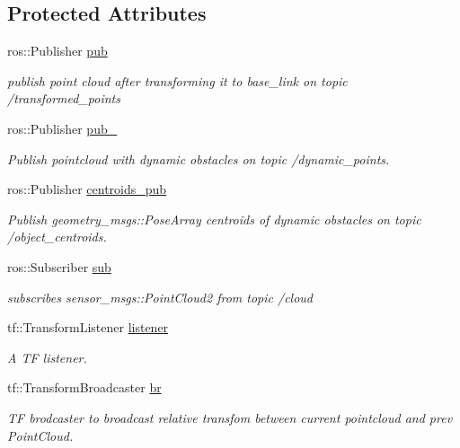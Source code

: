 \subsection*{Protected Attributes}
\begin{DoxyCompactItemize}
\item 
ros\+::\+Publisher \hyperlink{classdatmo_1_1cloud__segmentation_a01955e35ed0d12b9da4d4d9afb1007e3}{pub}
\begin{DoxyCompactList}\small\item\em publish point cloud after transforming it to base\+\_\+link on topic /transformed\+\_\+points \end{DoxyCompactList}\item 
ros\+::\+Publisher \hyperlink{classdatmo_1_1cloud__segmentation_a0e1bf18752add68fc2df89e212750d91}{pub\+\_}
\begin{DoxyCompactList}\small\item\em Publish pointcloud with dynamic obstacles on topic /dynamic\+\_\+points. \end{DoxyCompactList}\item 
ros\+::\+Publisher \hyperlink{classdatmo_1_1cloud__segmentation_a287579b3989262f060341ebca1ed53b2}{centroids\+\_\+pub}
\begin{DoxyCompactList}\small\item\em Publish geometry\+\_\+msgs\+::\+Pose\+Array centroids of dynamic obstacles on topic /object\+\_\+centroids. \end{DoxyCompactList}\item 
ros\+::\+Subscriber \hyperlink{classdatmo_1_1cloud__segmentation_a72e340852b66e150cb7f0e25214b7439}{sub}
\begin{DoxyCompactList}\small\item\em subscribes sensor\+\_\+msgs\+::\+Point\+Cloud2 from topic /cloud \end{DoxyCompactList}\item 
tf\+::\+Transform\+Listener \hyperlink{classdatmo_1_1cloud__segmentation_abf9b807df25f63ea330b165a9f2e4be1}{listener}
\begin{DoxyCompactList}\small\item\em A TF listener. \end{DoxyCompactList}\item 
tf\+::\+Transform\+Broadcaster \hyperlink{classdatmo_1_1cloud__segmentation_aa2712034cbe68df4d19b0fcf87f9b465}{br}
\begin{DoxyCompactList}\small\item\em TF brodcaster to broadcast relative transfom between current pointcloud and prev Point\+Cloud. \end{DoxyCompactList}\item 

\end{DoxyCompactItemize}
